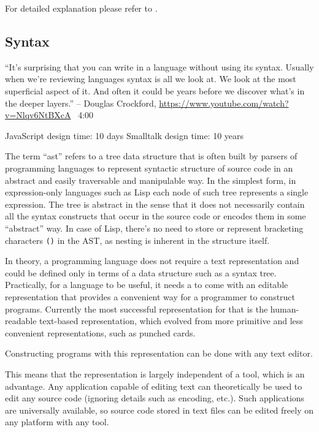 For detailed explanation please refer to \cite{sicp_meta}.

\subsection{Syntax}

``It's surprising that you can write in a language without using its syntax. Usually when we're reviewing languages syntax is all we look at. We look at the most superficial aspect of it. And often it could be years before we discover what's in the deeper layers.''
-- Douglas Crockford, \url{https://www.youtube.com/watch?v=Nlqv6NtBXcA} ~4:00

JavaScript design time: 10 days
Smalltalk design time: 10 years


The term ``\acrlong{ast}'' refers to a tree data structure that is often built by parsers of programming languages to represent syntactic structure of source code in an abstract and easily traversable and manipulable way. In the simplest form, in expression-only languages such as Lisp each node of such tree represents a single expression. The tree is abstract in the sense that it does not necessarily contain all the syntax constructs that occur in the source code or encodes them in some ``abstract'' way. In case of Lisp, there's no need to store or represent bracketing characters \texttt{()} in the AST, as nesting is inherent in the structure itself.

In theory, a programming language does not require a text representation and could be defined only in terms of a data structure such as a syntax tree. Practically, for a language to be useful, it needs a to come with an editable representation that provides a convenient way for a programmer to construct programs. Currently the most successful representation for that is the human-readable text-based representation, which evolved from more primitive and less convenient representations, such as punched cards.

Constructing programs with this representation can be done with any text editor.

This means that the representation is largely independent of a tool, which is an advantage. Any application capable of editing text can theoretically be used to edit any source code (ignoring details such as encoding, etc.). Such applications are universally available, so source code stored in text files can be edited freely on any platform with any tool.

